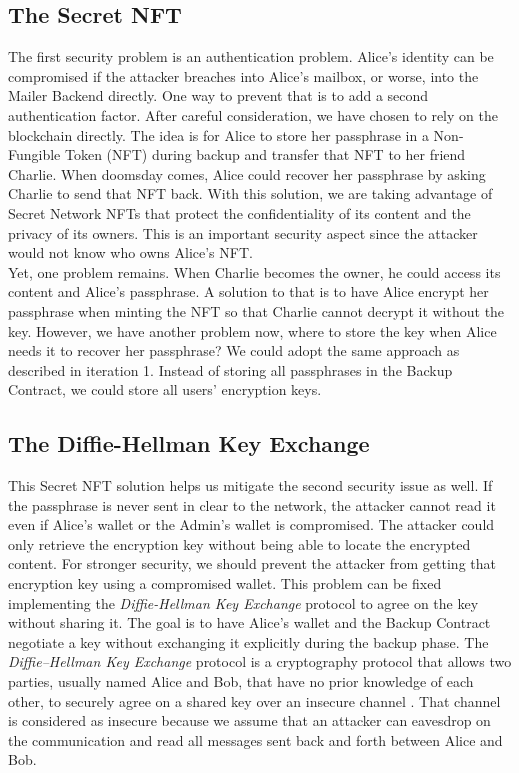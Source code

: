 \documentclass[runningheads]{llncs}
\begin{document}
\subsection{The Secret NFT}

The first security problem is an authentication problem. Alice’s identity can be compromised if the attacker breaches into Alice’s mailbox, or worse, into the Mailer Backend directly. One way to prevent that is to add a second authentication factor. After careful consideration, we have chosen to rely on the blockchain directly. The idea is for Alice to store her passphrase in a Non-Fungible Token (NFT) \cite{wang2021non} during backup and transfer that NFT to her friend Charlie. When doomsday comes, Alice could recover her passphrase by asking Charlie to send that NFT back. With this solution, we are taking advantage of Secret Network NFTs that protect the confidentiality of its content and the privacy of its owners. This is an important security aspect since the attacker would not know who owns Alice's NFT.\\ 

Yet, one problem remains. When Charlie becomes the owner, he could access its content and Alice's passphrase. A solution to that is to have Alice encrypt her passphrase when minting the NFT so that Charlie cannot decrypt it without the key. However, we have another problem now, where to store the key when Alice needs it to recover her passphrase? We could adopt the same approach as described in iteration 1. Instead of storing all passphrases in the Backup Contract, we could store all users' encryption keys. 

\subsection{The Diffie-Hellman Key Exchange}

This Secret NFT solution helps us mitigate the second security issue as well. If the passphrase is never sent in clear to the network, the attacker cannot read it even if Alice's wallet or the Admin's wallet is compromised. The attacker could only retrieve the encryption key without being able to locate the encrypted content. For stronger security, we should prevent the attacker from getting that encryption key using a compromised wallet. This problem can be fixed implementing the {\em Diffie-Hellman Key Exchange} protocol to agree on the key without sharing it. The goal is to have Alice's wallet and the Backup Contract negotiate a key without exchanging it explicitly during the backup phase. The {\em Diffie–Hellman Key Exchange} protocol is a cryptography protocol that allows two parties, usually named Alice and Bob, that have no prior knowledge of each other, to securely agree on a shared key over an insecure channel \cite{diffie2022new}. That channel is considered as insecure because we assume that an attacker can eavesdrop on the communication and read all messages sent back and forth between Alice and Bob. \\
\end{document}
